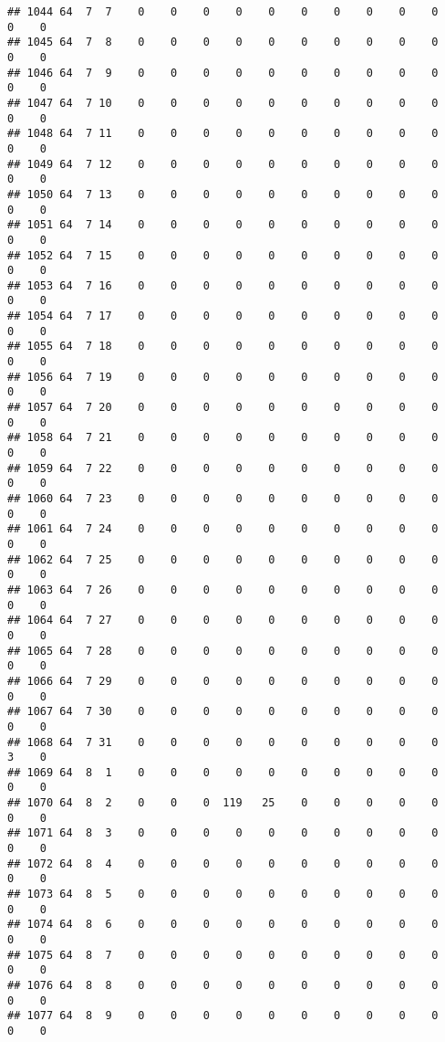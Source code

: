 \documentclass[]{article}
\begin{document}
\begin{verbatim}
## 1044 64  7  7    0    0    0    0    0    0    0    0    0    0    0    0
## 1045 64  7  8    0    0    0    0    0    0    0    0    0    0    0    0
## 1046 64  7  9    0    0    0    0    0    0    0    0    0    0    0    0
## 1047 64  7 10    0    0    0    0    0    0    0    0    0    0    0    0
## 1048 64  7 11    0    0    0    0    0    0    0    0    0    0    0    0
## 1049 64  7 12    0    0    0    0    0    0    0    0    0    0    0    0
## 1050 64  7 13    0    0    0    0    0    0    0    0    0    0    0    0
## 1051 64  7 14    0    0    0    0    0    0    0    0    0    0    0    0
## 1052 64  7 15    0    0    0    0    0    0    0    0    0    0    0    0
## 1053 64  7 16    0    0    0    0    0    0    0    0    0    0    0    0
## 1054 64  7 17    0    0    0    0    0    0    0    0    0    0    0    0
## 1055 64  7 18    0    0    0    0    0    0    0    0    0    0    0    0
## 1056 64  7 19    0    0    0    0    0    0    0    0    0    0    0    0
## 1057 64  7 20    0    0    0    0    0    0    0    0    0    0    0    0
## 1058 64  7 21    0    0    0    0    0    0    0    0    0    0    0    0
## 1059 64  7 22    0    0    0    0    0    0    0    0    0    0    0    0
## 1060 64  7 23    0    0    0    0    0    0    0    0    0    0    0    0
## 1061 64  7 24    0    0    0    0    0    0    0    0    0    0    0    0
## 1062 64  7 25    0    0    0    0    0    0    0    0    0    0    0    0
## 1063 64  7 26    0    0    0    0    0    0    0    0    0    0    0    0
## 1064 64  7 27    0    0    0    0    0    0    0    0    0    0    0    0
## 1065 64  7 28    0    0    0    0    0    0    0    0    0    0    0    0
## 1066 64  7 29    0    0    0    0    0    0    0    0    0    0    0    0
## 1067 64  7 30    0    0    0    0    0    0    0    0    0    0    0    0
## 1068 64  7 31    0    0    0    0    0    0    0    0    0    0    3    0
## 1069 64  8  1    0    0    0    0    0    0    0    0    0    0    0    0
## 1070 64  8  2    0    0    0  119   25    0    0    0    0    0    0    0
## 1071 64  8  3    0    0    0    0    0    0    0    0    0    0    0    0
## 1072 64  8  4    0    0    0    0    0    0    0    0    0    0    0    0
## 1073 64  8  5    0    0    0    0    0    0    0    0    0    0    0    0
## 1074 64  8  6    0    0    0    0    0    0    0    0    0    0    0    0
## 1075 64  8  7    0    0    0    0    0    0    0    0    0    0    0    0
## 1076 64  8  8    0    0    0    0    0    0    0    0    0    0    0    0
## 1077 64  8  9    0    0    0    0    0    0    0    0    0    0    0    0

\end{verbatim}
\end{document}
